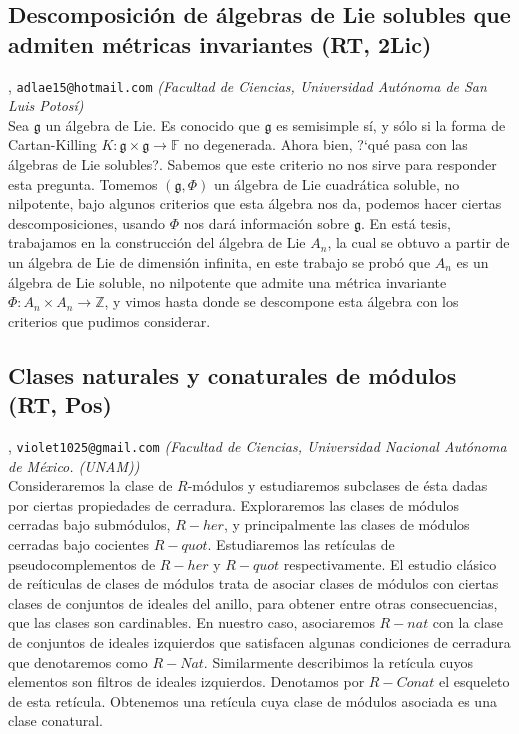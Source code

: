 \subsection{\sffamily Descomposici\'on de \'algebras de Lie solubles que admiten m\'etricas invariantes {\footnotesize (RT, 2Lic)}} \label{reg-815} 
, {\tt adlae15@hotmail.com}  {\slshape (Facultad de Ciencias, Universidad Aut\'onoma de San Luis Potos\'i)}\\
          \noindent  Sea $ \mathfrak{g} $ un \'algebra de Lie. Es conocido que $\mathfrak{g}$ es semisimple s\'i, y s\'olo si la forma de Cartan-Killing $K : \mathfrak{g} \times \mathfrak{g} \longrightarrow \mathbb{F}$ no degenerada. Ahora bien, ?`qu\'e pasa con las \'algebras de Lie solubles?. Sabemos que este criterio no nos sirve para responder esta pregunta. Tomemos $(\mathfrak{g},\Phi)$ un \'algebra de Lie cuadr\'atica soluble, no nilpotente, bajo algunos criterios que esta \'algebra nos da, podemos hacer ciertas descomposiciones, usando $\Phi$ nos dar\'a informaci\'on sobre $\mathfrak{g}$. En est\'a tesis, trabajamos en la construcci\'on del \'algebra de Lie $A_n$, la cual se obtuvo a partir de un \'algebra de Lie de dimensi\'on infinita, en este trabajo se prob\'o que $A_n$ es un \'algebra de Lie soluble, no nilpotente que admite una m\'etrica invariante $\Phi : A_n \times A_n \longrightarrow \mathbb{Z}$, y vimos hasta donde se descompone esta \'algebra con los criterios que pudimos considerar.
\subsection{\sffamily Clases naturales y conaturales de m\'odulos {\footnotesize (RT, Pos)}} \label{reg-496} 
, {\tt violet1025@gmail.com}  {\slshape (Facultad de Ciencias, Universidad Nacional Aut\'onoma de M\'exico. (UNAM))}\\
          \noindent Consideraremos la clase de $R$-m\'odulos y estudiaremos subclases de \'esta dadas por ciertas propiedades de cerradura. Exploraremos las clases de m\'odulos cerradas bajo subm\'odulos, $R-her$, y principalmente las clases de m\'odulos cerradas bajo cocientes $R-quot$. Estudiaremos las ret\'iculas de  pseudocomplementos de  $R-her$ y $R-quot$ respectivamente. El estudio cl\'asico de re\'iticulas de clases de m\'odulos trata de asociar clases de m\'odulos con ciertas clases de conjuntos de ideales del anillo, para obtener entre otras consecuencias, que las clases son cardinables.  En nuestro caso, asociaremos $R-nat$ con la clase de conjuntos de ideales izquierdos que satisfacen algunas condiciones de cerradura que denotaremos como $R-Nat$. Similarmente describimos la ret\'icula cuyos elementos son filtros de ideales izquierdos. Denotamos por $R-Conat$ el esqueleto de esta ret\'icula. Obtenemos una ret\'icula cuya clase de m\'odulos asociada es una clase conatural.
